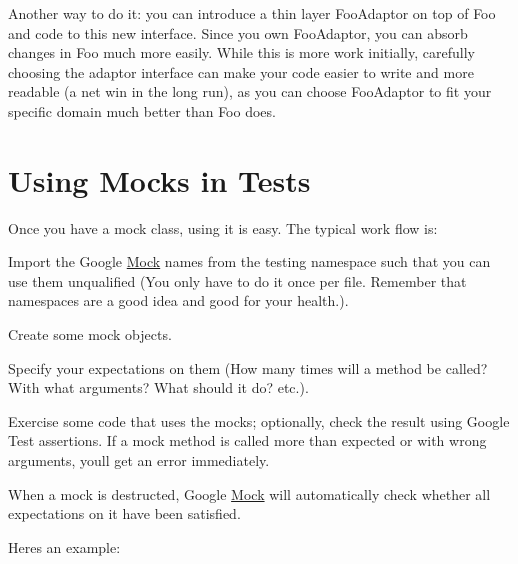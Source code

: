Another way to do it\+: you can introduce a thin layer {\ttfamily Foo\+Adaptor} on top of {\ttfamily Foo} and code to this new interface. Since you own {\ttfamily Foo\+Adaptor}, you can absorb changes in {\ttfamily Foo} much more easily. While this is more work initially, carefully choosing the adaptor interface can make your code easier to write and more readable (a net win in the long run), as you can choose {\ttfamily Foo\+Adaptor} to fit your specific domain much better than {\ttfamily Foo} does.

\section*{Using Mocks in Tests}

Once you have a mock class, using it is easy. The typical work flow is\+:


\begin{DoxyEnumerate}
\item Import the Google \hyperlink{class_mock}{Mock} names from the {\ttfamily testing} namespace such that you can use them unqualified (You only have to do it once per file. Remember that namespaces are a good idea and good for your health.).
\end{DoxyEnumerate}
\begin{DoxyEnumerate}
\item Create some mock objects.
\end{DoxyEnumerate}
\begin{DoxyEnumerate}
\item Specify your expectations on them (How many times will a method be called? With what arguments? What should it do? etc.).
\end{DoxyEnumerate}
\begin{DoxyEnumerate}
\item Exercise some code that uses the mocks; optionally, check the result using Google Test assertions. If a mock method is called more than expected or with wrong arguments, you\textquotesingle{}ll get an error immediately.
\end{DoxyEnumerate}
\begin{DoxyEnumerate}
\item When a mock is destructed, Google \hyperlink{class_mock}{Mock} will automatically check whether all expectations on it have been satisfied.
\end{DoxyEnumerate}

Here\textquotesingle{}s an example\+:


